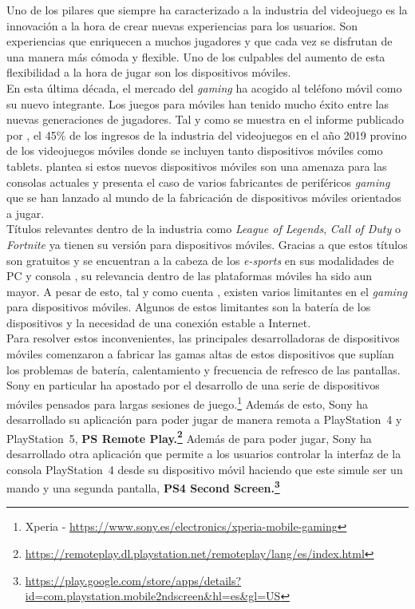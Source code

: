 Uno de los pilares que siempre ha caracterizado a la industria del videojuego es la innovaci\'on a la hora de crear nuevas experiencias para los usuarios. Son experiencias que enriquecen a muchos jugadores y que cada vez se disfrutan de una manera m\'as c\'omoda y flexible. Uno de los culpables del aumento de esta flexibilidad a la hora de jugar son los dispositivos m\'oviles. \\

En esta \'ultima d\'ecada, el mercado del \textit{gaming} ha acogido al tel\'efono m\'ovil como su nuevo integrante. Los juegos para m\'oviles han tenido mucho \'exito entre las nuevas generaciones de jugadores. Tal y como se muestra en el informe publicado por \cite{AEVI2019}, el 45\% de los ingresos de la industria del videojuegos en el a\~no 2019 provino de los videojuegos m\'oviles donde se incluyen tanto dispositivos m\'oviles como tablets. \cite{moviles} plantea si estos nuevos dispositivos m\'oviles son una amenaza para las consolas actuales y presenta el caso de varios fabricantes de perif\'ericos \textit{gaming} que se han lanzado al mundo de la fabricaci\'on de dispositivos m\'oviles orientados a jugar. \\

T\'itulos relevantes dentro de la industria como \textit{League of Legends}, \textit{Call of Duty} o \textit{Fortnite} ya tienen su versi\'on para dispositivos m\'oviles. Gracias a que estos t\'itulos son gratuitos y se encuentran a la cabeza de los \textit{e-sports} en sus modalidades de PC y consola \citep*{TEOQ32020}, su relevancia dentro de las plataformas m\'oviles ha sido aun mayor. A pesar de esto, tal y como cuenta \cite{futuro}, existen varios limitantes en el \textit{gaming} para dispositivos m\'oviles. Algunos de estos limitantes son la bater\'ia de los dispositivos y la necesidad de una conexi\'on estable a Internet.\\

Para resolver estos inconvenientes, las principales desarrolladoras de dispositivos m\'oviles comenzaron a fabricar las gamas altas de estos dispositivos que supl\'ian los problemas de bater\'ia, calentamiento y frecuencia de refresco de las pantallas. Sony en particular ha apostado por el desarrollo de una serie de dispositivos m\'oviles pensados para largas sesiones de juego.\footnote{Xperia -  \url{https://www.sony.es/electronics/xperia-mobile-gaming}} Adem\'as de esto, Sony ha desarrollado su aplicaci\'on para poder jugar de manera remota a PlayStation~4 y PlayStation~5, \textbf{PS Remote Play.\footnote{\url{https://remoteplay.dl.playstation.net/remoteplay/lang/es/index.html}}} Adem\'as de para poder jugar, Sony ha desarrollado otra aplicaci\'on que permite a los usuarios controlar la interfaz de la consola PlayStation~4 desde su dispositivo m\'ovil haciendo que este simule ser un mando y una segunda pantalla, \textbf{PS4 Second Screen.\footnote{\url{https://play.google.com/store/apps/details?id=com.playstation.mobile2ndscreen&hl=es&gl=US}}}\\

